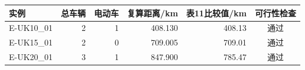 \begin{tabular}{lrrrrc}
\toprule
实例 & 总车辆 & 电动车 & 复算距离/km & 表11比较值/km & 可行性检查\\
\midrule
E-UK10\_01 & 2 & 1 & 408.130 & 408.13 & 通过\\
E-UK15\_01 & 2 & 0 & 709.005 & 709.01 & 通过\\
E-UK20\_01 & 3 & 1 & 847.900 & 785.47 & 通过\\
\bottomrule
\end{tabular}
